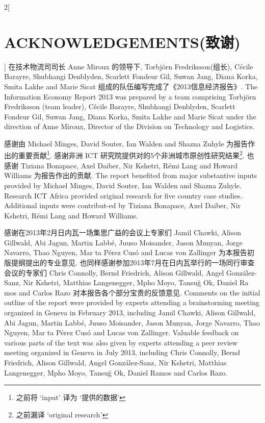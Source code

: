 \documentclass[a4paper, UTF8, 12pt]{article}
\begin{document}
\begin{paracol}{2}[\section{ACKNOWLEDGEMENTS(致谢)}]
    \switchcolumn*
    在技术物流司司长 Anne Miroux 的领导下, Torbjörn Fredriksson(组长), Cécile Barayre, Shubhangi Denblyden, Scarlett Fondeur Gil, Suwan Jang, Diana Korka, Smita Lakhe and Marie Sicat 组成的队伍编写完成了《2013信息经济报告》.
    \switchcolumn
    The Information Economy Report 2013 was prepared by a team comprising Torbjörn Fredriksson (team leader), Cécile Barayre, Shubhangi Denblyden, Scarlett Fondeur Gil, Suwan Jang, Diana Korka, Smita Lakhe and Marie Sicat under the direction of Anne Miroux, Director of the Division on Technology and Logistics. 
   
    \switchcolumn*
    感谢由 Michael Minges, David Souter, Ian Walden and Shazna Zuhyle 为报告作出的重要贡献\footnote{之前将 `input' 译为 `提供的数据'}. 感谢非洲 ICT 研究院提供对的5个非洲城市原创性研究结果\footnote{之前漏译 `original research'}. 也感谢 Tiziana Bonapace, Axel Daiber, Nir Kshetri, Rémi Lang and Howard Williams 为报告作出的贡献.
    \switchcolumn
    The report benefited from major substantive inputs provided by Michael Minges, David Souter, Ian Walden and Shazna Zuhyle. Research ICT Africa provided original research for five country case studies. Additional inputs were contribut-ed by Tiziana Bonapace, Axel Daiber, Nir Kshetri, Rémi Lang and Howard Williams. 
   
    \switchcolumn*
    感谢在2013年2月日内瓦一场集思广益的会议上专家们 Jamil Chawki, Alison Gillwald, Abi Jagun, Martin Labbé, Juuso Moisander, Jason Munyan, Jorge Navarro, Thao Nguyen, Mar ta Pérez Cusó and Lucas von Zallinger 为本报告初版提纲提出的专业意见. 也同样感谢参加2013年7月在日内瓦举行的一场同行审查会议的专家们 Chris Connolly, Bernd Friedrich, Alison Gillwald, Angel González-Sanz, Nir Kshetri, Matthias Langenegger, Mpho Moyo, Tansuğ Ok, Daniel Ra mos and Carlos Razo 对本报告各个部分宝贵的反馈意见.
    \switchcolumn
    Comments on the initial outline of the report were provided by experts attending a brainstorming meeting organized in Geneva in February 2013, including Jamil Chawki, Alison Gillwald, Abi Jagun, Martin Labbé, Juuso Moisander, Jason Munyan, Jorge Navarro, Thao Nguyen, Mar ta Pérez Cusó and Lucas von Zallinger. Valuable feedback on various parts of the text was also given by experts attending a peer review meeting organized in Geneva in July 2013, including Chris Connolly, Bernd Friedrich, Alison Gillwald, Angel González-Sanz, Nir Kshetri, Matthias Langenegger, Mpho Moyo, Tansuğ Ok, Daniel Ramos and Carlos Razo. 
   

\end{paracol}
\end{document}

